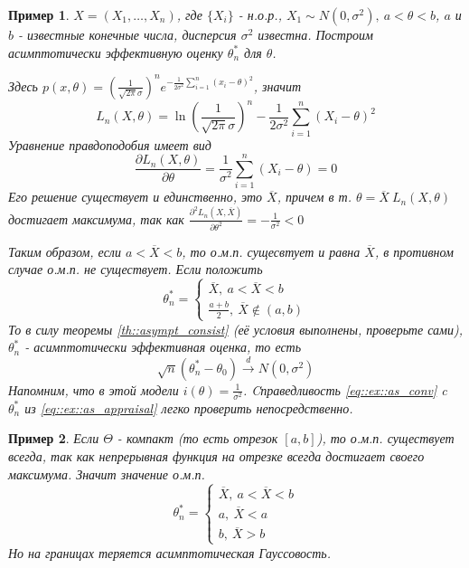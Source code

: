 \documentclass[12pt]{article}
\newtheorem*{example}{Пример}
\theoremstyle{basic_theorem}
\theoremstyle{name_theorem}
\begin{document}
\begin{example}
        \(X = (X_1, \ldots, X_n)\), где \(\{X_i\}\) - н.о.р., \(X_1 \sim N(0, \sigma^2),\ a < \theta < b\),
        \(a\) и \(b\) - известные конечные числа, дисперсия \(\sigma^2\) известна.
        Построим асимптотически эффективную оценку \(\theta^*_n\) для \(\theta\).

        Здесь \(p(x, \theta) = \left(\frac{1}{\sqrt{2\pi} \sigma}\right)^ne^{-\frac{1}{2\sigma^2}\sum_{i=1}^n (x_i-\theta)^2}\),
        значит
        \[L_n(X, \theta) = \ln\left(\frac{1}{\sqrt{2\pi}\sigma}\right)^n - \frac{1}{2\sigma^2}\sum_{i=1}^n(X_i-\theta)^2\]
        Уравнение правдоподобия имеет вид
        \[\frac{\partial L_n(X, \theta)}{\partial\theta} = \frac{1}{\sigma^2}\sum_{i=1}^n(X_i - \theta) = 0\]
        Его решение существует и единственно, это \(\overline{X}\), причем
        в т. \(\theta = \overline{X}\ L_n(X,\theta)\) достигает максимума,
        так как \(\frac{\partial^2 L_n(X, \overline{X})}{\partial\theta^2} = - \frac{1}{\sigma^2} < 0\)

        Таким образом, если \(a < \overline{X} < b\), то о.м.п. сущесвтует и равна \(\overline{X}\),
        в противном случае о.м.п. не существует. Если положить
        \begin{equation}
            \label{eq::ex::as_appraisal}
            \theta^*_n = \begin{cases}
                \overline{X},\ a < \overline{X} < b \\
                \frac{a+b}{2},\ \overline{X} \notin (a,b)
            \end{cases}
        \end{equation}
        То в силу теоремы \ref{th::asympt_consist} (её условия
        выполнены, проверьте сами), \(\theta^*_n\) - асимптотически эффективная оценка, то есть
        \begin{equation}
            \label{eq::ex::as_conv}
            \sqrt{n}(\theta^*_n - \theta_0) \xrightarrow{d} N(0, \sigma^2)
        \end{equation}
        Напомним, что в этой модели \(i(\theta) = \frac{1}{\sigma^2}\).
        Cправедливость \eqref{eq::ex::as_conv} c \(\theta^*_n\)
        из \eqref{eq::ex::as_appraisal} легко проверить непосредственно.
\end{example}
\begin{example}
    Если \(\Theta\) - компакт (то есть отрезок \([a, b]\)), то о.м.п. существует
    всегда, так как непрерывная функция на отрезке всегда достигает своего максимума.
    Значит значение о.м.п.
    \begin{equation*}
        \theta^*_n = \begin{cases}
            \overline{X},\ a < \overline{X} < b \\
            a,\ \overline{X} < a \\
            b,\ \overline{X} > b
        \end{cases}
    \end{equation*}
    Но на границах теряется асимптотическая Гауссовость.
\end{example}
\end{document}
